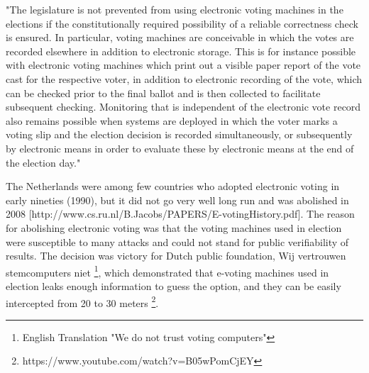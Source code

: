   "The legislature is not prevented from using electronic voting machines 
  in the elections if the constitutionally required possibility of a 
  reliable correctness check is ensured. In particular, voting machines 
  are conceivable in which the votes are recorded elsewhere in addition
   to electronic storage. This is for instance possible with electronic
   voting machines which print out a visible paper report of the vote 
   cast for the respective voter, in addition to electronic recording 
   of the vote, which can be checked prior to the final ballot and is
    then collected to facilitate subsequent checking. Monitoring that is
     independent of the electronic vote record also remains possible when
     systems are deployed in which the voter marks a voting slip and the 
     election decision is recorded simultaneously, 
     or subsequently by electronic means in 
     order to evaluate these by electronic means at the end of the 
     election day."
  
  The Netherlands were among few countries who adopted electronic voting 
  in early nineties (1990), but it did not go very well long run and was 
  abolished in 2008 
  [http://www.cs.ru.nl/B.Jacobs/PAPERS/E-votingHistory.pdf]. 
  The reason for abolishing electronic voting was that   
  the voting machines used in election were susceptible to many attacks
   and could not stand 
  for public verifiability of results. The decision was victory for 
  Dutch public foundation, Wij vertrouwen stemcomputers niet
  \footnote{English Translation "We do not trust voting computers"}, which 
  demonstrated that e-voting machines used in election leaks enough
  information to guess the option, 
  and they can be easily intercepted from 20 to 30 meters
  \footnote{https://www.youtube.com/watch?v=B05wPomCjEY}. 
  
